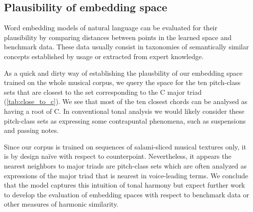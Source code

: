 
\subsection{Plausibility of embedding space}

Word embedding models of natural language can be evaluated for their plausibility by comparing distances between points in the learned space and benchmark data. These data usually consist in taxonomies of semantically similar concepts established by usage or extracted from expert knowledge.

As a quick and dirty way of establishing the plausbility of our embedding space trained on the whole musical corpus, we query the space for the ten pitch-class sets that are closest to the set corresponding to the C major triad (\ref{tab:close_to_c}). We see that most of the ten closest chords can be analysed as having a root of C. In conventional tonal analysis we would likely consider these pitch-class sets as expressing some contrapuntal phenomena, such as suspensions and passing notes.

Since our corpus is trained on sequences of salami-sliced musical textures only, it is by design na\"{i}ve with respect to counterpoint. Nevertheless, it appears the nearest neighbors to major triads are pitch-class sets which are often analyzed as expressions of the major triad that is nearest in voice-leading terms. We conclude that the model captures this intuition of tonal harmony but expect further work to develop the evaluation of embedding spaces with respect to benchmark data or other measures of harmonic similarity.  

